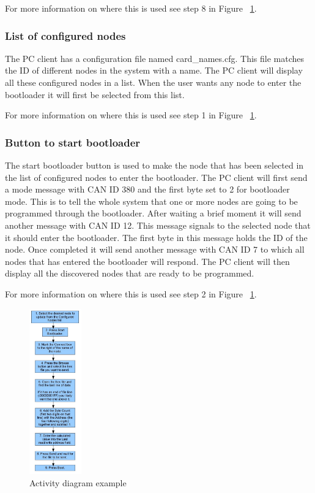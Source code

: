 For more information on where this is used see step 8 in Figure ~\ref{fig:activity_figure}.

\subsubsection{List of configured nodes}
The PC client has a configuration file named card\_names.cfg. This file matches the ID of different nodes in the system with a name. The PC client will display all these configured nodes in a list. When the user wants any node to enter the bootloader it will first be selected from this list.

For more information on where this is used see step 1 in Figure ~\ref{fig:activity_figure}.

\subsubsection{Button to start bootloader}
The start bootloader button is used to make the node that has been selected in the list of configured nodes to enter the bootloader. The PC client will first send a mode message with CAN ID 380 and the first byte set to 2 for bootloader mode. This is to tell the whole system that one or more nodes are going to be programmed through the bootloader. After waiting a brief moment it will send another message with CAN ID 12. This message signals to the selected node that it should enter the bootloader. The first byte in this message holds the ID of the node. Once completed it will send another message with CAN ID 7 to which all nodes that has entered the bootloader will respond. The PC client will then display all the discovered nodes that are ready to be programmed.

For more information on where this is used see step 2 in Figure ~\ref{fig:activity_figure}.

\begin{figure}[h]
\begin{center}
    \includegraphics[width=0.20\textwidth]{./figure/activity.jpg}
\end{center}
    \caption{Activity diagram example}
    \label{fig:activity_figure}
\end{figure}